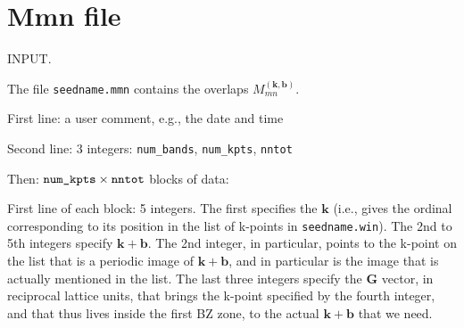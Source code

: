 %
%
%
%

\section{Mmn file} 

INPUT. 

The file \verb#seedname.mmn# contains the overlaps
$M_{mn}^{(\mathbf{k,b})}$.

First line: a user comment, e.g., the date and time

Second line: 3 integers: \verb#num_bands#, \verb#num_kpts#,
\verb#nntot#

Then: $\verb#num_kpts#\times\verb#nntot#$ blocks of data:
 
First line of each block: 5 integers. The first specifies the
$\mathbf{k}$ (i.e., gives the ordinal corresponding to its position in
the list  of k-points in \verb#seedname.win#). The 2nd to 5th integers
specify $\mathbf{k+b}$. The  2nd integer, in particular, points to the
k-point on the list that is a  periodic image of $\mathbf{k+b}$, and
in particular is the image that is actually mentioned in the list. The 
last three integers specify the $\mathbf{G}$ vector, in  reciprocal
lattice units, that brings the k-point specified by the fourth
integer, and that thus lives inside the first BZ zone, to the actual
$\mathbf{k+b}$ that we need.

